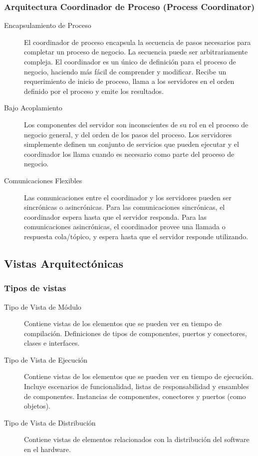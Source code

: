 \subsubsection{Arquitectura Coordinador de Proceso (Process Coordinator)}
\begin{description}
	\item[Encapsulamiento de Proceso] El coordinador de proceso encapsula la secuencia de pasos necesarios para completar un proceso de negocio. La secuencia puede ser arbitrariamente compleja. El coordinador es un único de definición para el proceso de negocio, haciendo más fácil de comprender y modificar. Recibe un requerimiento de inicio de proceso, llama a los servidores en el orden definido por el proceso y emite los resultados.
	\item[Bajo Acoplamiento] Los componentes del servidor son inconscientes de su rol en el proceso de negocio general, y del orden de los pasos del proceso. Los servidores simplemente definen un conjunto de servicios que pueden ejecutar y el coordinador los llama cuando es necesario como parte del proceso de negocio.
	\item[Comunicaciones Flexibles] Las comunicaciones entre el coordinador y los servidores pueden ser sincrónicas o asincrónicas. Para las comunicaciones sincrónicas, el coordinador espera hasta que el servidor responda. Para las comunicaciones asincrónicas, el coordinador provee una llamada o respuesta cola/tópico, y espera hasta que el servidor responde utilizando.
\end{description}

\subsection{Vistas Arquitectónicas}
\subsubsection{Tipos de vistas}
\begin{description}
	\item[Tipo de Vista de Módulo] Contiene vistas de los elementos que se pueden ver en tiempo de compilación. Definiciones de tipos de componentes, puertos y conectores, clases e interfaces.
	\item[Tipo de Vista de Ejecución] Contiene vistas de los elementos que se pueden ver en tiempo de ejecución. Incluye escenarios de funcionalidad, listas de responsabilidad y ensambles de componentes. Instancias de componentes, conectores y puertos (como objetos).
	\item[Tipo de Vista de Distribución] Contiene vistas de elementos relacionados con la distribución del software en el hardware.
\end{description}
